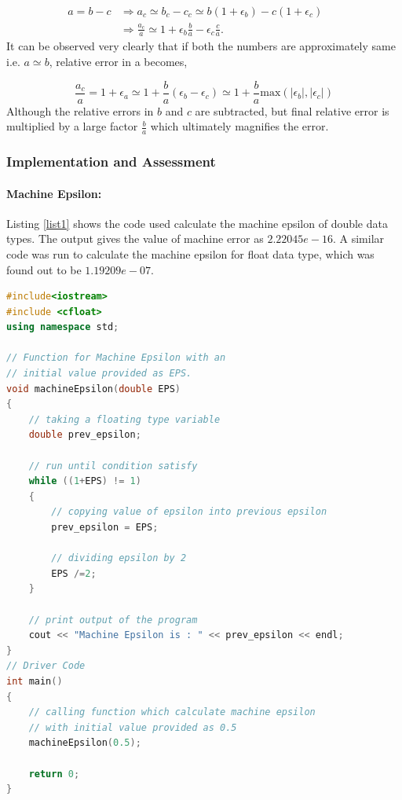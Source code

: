 \documentclass[a4,12pt]{article}
\numberwithin{equation}{subsection}
\begin{document}
\begin{align}
a = b - c & \Rightarrow a_c \simeq b_c - c_c \simeq b(1+\epsilon_b) - c(1+\epsilon_c) && \\
& \Rightarrow \frac{a_c}{a} \simeq 1+ \epsilon_b \frac{b}{a} - \epsilon_c \frac{c}{a} .&&
\end{align}
It can be observed very clearly that if both the numbers are approximately same i.e. $a \simeq b$, relative error in a becomes,

\begin{equation}
  \frac{a_c}{a} = 1 + \epsilon_a \simeq 1+ \frac{b}{a}(\epsilon_b-\epsilon_c) \simeq 1+\frac{b}{a} \text{max}(|\epsilon_b|, |\epsilon_c|)
\end{equation}
Although the relative errors in $b$ and $c$ are subtracted, but final relative error is multiplied by a large factor $\frac{b}{a}$ which ultimately magnifies the error.

\subsubsection{Implementation and Assessment }
\paragraph{Machine Epsilon:}
Listing \ref{list1} shows the code used calculate the machine epsilon of double data types. The output gives the value of machine error as $2.22045e-16$. A similar code was run to calculate the machine epsilon for float data type, which was found out to be $1.19209e-07$.  

\begin{lstlisting}[language=C++, caption= Code to calculate the machine epsilon of double data types., label= list1]
#include<iostream>
#include <cfloat>
using namespace std;

// Function for Machine Epsilon with an
// initial value provided as EPS.
void machineEpsilon(double EPS)
{
    // taking a floating type variable
    double prev_epsilon;

    // run until condition satisfy
    while ((1+EPS) != 1)
    {
        // copying value of epsilon into previous epsilon
        prev_epsilon = EPS;

        // dividing epsilon by 2
        EPS /=2;
    }

    // print output of the program
    cout << "Machine Epsilon is : " << prev_epsilon << endl;
}
// Driver Code
int main()
{
    // calling function which calculate machine epsilon
    // with initial value provided as 0.5
    machineEpsilon(0.5);

    return 0;
}
\end{lstlisting}
\end{document}
